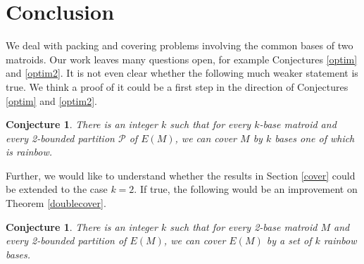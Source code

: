 \documentclass{article}
\newtheorem{Conjecture}[Statement]{Conjecture}
\begin{document}
\section{Conclusion}\label{conc}
We deal with packing and covering problems involving the common bases of two matroids. Our work leaves many questions open, for example Conjectures \ref{optim} and \ref{optim2}. It is not even clear whether the following much weaker statement is true. We think a proof of it could be a first step in the direction of Conjectures \ref{optim} and \ref{optim2}.

\begin{Conjecture}\label{optim3}
There is an integer $k$ such that for every $k$-base matroid and every 2-bounded partition $\mathcal{P}$ of $E(M)$, we can cover $M$ by $k$ bases one of which is rainbow.
\end{Conjecture}

Further, we would like to understand whether the results in Section \ref{cover} could be extended to the case $k=2$. If true, the following would be an improvement on Theorem \ref{doublecover}.
\begin{Conjecture}
There is an integer $k$ such that for every 2-base matroid $M$ and every 2-bounded partition of $E(M)$, we can cover $E(M)$ by a set of $k$ rainbow bases.
\end{Conjecture}
\end{document}

